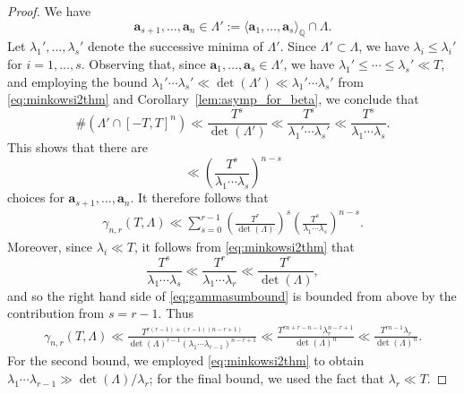 \documentclass[11pt,reqno]{amsart}
\theoremstyle{definition}
\theoremstyle{remark}
\numberwithin{equation}{section}
\numberwithin{thm}{section}
\numberwithin{table}{section}
\def \Q {{\mathbb Q}}
\def\a{\mathbf{a}}
\begin{document}
\begin{proof}
        We have 
        \[
        \a_{s+1}, \ldots, \a_n \in 
        \Lambda' := 
        \langle \a_1, \ldots, \a_s\rangle_{\Q} \cap \Lambda.
        \]
        Let $\lambda_1', \ldots, \lambda_s'$ denote the successive minima of $\Lambda'$. Since $\Lambda' \subset \Lambda$, we have $\lambda_i \le \lambda_i'$ for $i = 1,\ldots,s$.        
       Observing that, since $\a_1, \ldots, \a_s \in \Lambda'$, we have $\lambda_1' \le \cdots \le \lambda_s' \ll T$, and employing the bound $\lambda_1'\cdots\lambda_s' \ll \det(\Lambda') \ll \lambda_1'\cdots\lambda_s'$ from \eqref{eq:minkowsi2thm} and Corollary~\ref{lem:asymp_for_beta}, we conclude that
    \[
     \# (\Lambda ' \cap [-T,T]^n) 
     \ll \frac{T^s}{\det(\Lambda')}
         \ll  \frac{T^s}{\lambda_1'\cdots\lambda_s'} \ll \frac{T^s}{\lambda_1\cdots\lambda_s}.
    \] 
    This shows that there are 
    \[
    \ll \left(
    \frac{T^s}{\lambda_1\cdots\lambda_s}
    \right)^{n-s}
    \]
    choices for $\a_{s+1},\ldots,\a_n$.
    It therefore  follows that 
    \begin{align}\label{eq:gammasumbound}
    \gamma_{n,r}(T, \Lambda) 
    \ll
    \sum_{s=0}^{r-1} \left(\frac{T^r}{\det(\Lambda)}
    \right)^s 
    \left(\frac{T^s}{\lambda_1\cdots\lambda_s}
    \right)^{n-s}.
    \end{align}
Moreover, since  $\lambda_i \ll T$, it follows from \eqref{eq:minkowsi2thm} that 
    \[
    \frac{T^s}{\lambda_1 \cdots \lambda_s} \ll \frac{T^r}{\lambda_1 \cdots \lambda_r  } \ll 
    \frac{T^r}{\det(\Lambda)},
    \]
    and so the right hand side of \eqref{eq:gammasumbound} is bounded from above by the contribution from $s=r-1$. Thus
    \begin{align*}
        \gamma_{n,r}(T, \Lambda) \ll \frac{T^{r(r-1)+(r-1)(n-r+1)}}{\det(\Lambda)^{r-1}(\lambda_1 \cdots \lambda_{r-1})^{n-r+1}} 
        \ll 
        \frac{T^{rn+r-n-1}\lambda_r^{n-r+1}}{\det(\Lambda)^{n}} \ll \frac{T^{rn-1}\lambda_r}{\det(\Lambda)^{n}}.
    \end{align*}
    For the second bound, we employed  \eqref{eq:minkowsi2thm} to obtain $\lambda_1 \cdots \lambda_{r-1} \gg \det(\Lambda)/\lambda_r$; for the final bound, we used the fact that $\lambda_r\ll T$.    
    \end{proof}
    
\end{document}
